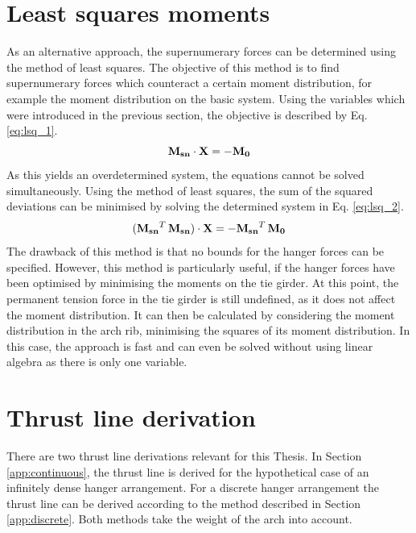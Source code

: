 \section{Least squares moments} \label{app:lsq}
As an alternative approach, the supernumerary forces can be determined using the method of least squares. The objective of this method is to find supernumerary forces which counteract a certain moment distribution, for example the moment distribution on the basic system. Using the variables which were introduced in the previous section, the objective is described by Eq. \eqref{eq:lsq_1}.
\begin{equation}
    {\bf M_{sn}} \cdot {\bf X} = -{\bf M_0}
    \label{eq:lsq_1}
\end{equation}
As this yields an overdetermined system, the equations cannot be solved simultaneously. Using the method of least squares, the sum of the squared deviations can be minimised by solving the determined system in Eq. \eqref{eq:lsq_2}.
\begin{equation}
    ({\bf M_{sn}}^T\,{\bf M_{sn}}) \cdot {\bf X} = -{\bf M_{sn}}^T\,{\bf M_0}
    \label{eq:lsq_2}
\end{equation}
The drawback of this method is that no bounds for the hanger forces can be specified. However, this method is particularly useful, if the hanger forces have been optimised by minimising the moments on the tie girder. At this point, the permanent tension force in the tie girder is still undefined, as it does not affect the moment distribution. It can then be calculated by considering the moment distribution in the arch rib, minimising the squares of its moment distribution. In this case, the approach is fast and can even be solved without using linear algebra as there is only one variable.

\section{Thrust line derivation} \label{app:thrust_line}
There are two thrust line derivations relevant for this Thesis. In Section \ref{app:continuous}, the thrust line is derived for the hypothetical case of an infinitely dense hanger arrangement. For a discrete hanger arrangement the thrust line can be derived according to the method described in Section \ref{app:discrete}. Both methods take the weight of the arch into account.

